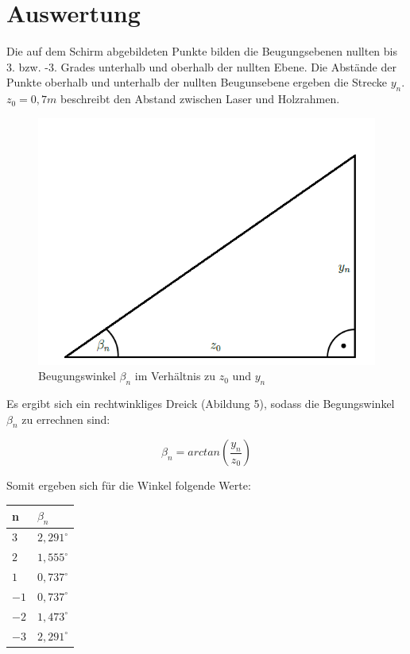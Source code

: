 \documentclass[12pt,a4paper,titlepage,headinclude,bibtotoc]{scrartcl}
\begin{document}
\section{Auswertung}

Die auf dem Schirm abgebildeten Punkte bilden die Beugungsebenen nullten bis 3. bzw. -3. Grades unterhalb und oberhalb der nullten Ebene. Die Abstände der Punkte oberhalb und unterhalb der nullten Beugunsebene ergeben die Strecke $y_n$. $z_0= 0,7 m$ beschreibt den Abstand zwischen Laser und Holzrahmen. 

\begin{figure} [h]
\begin{center}
\includegraphics[scale=0.4]{Dreieck.png} \end{center}
\caption{Beugungswinkel $\beta_n$ im Verhältnis zu $z_0$ und $y_n$}
\end{figure}

Es ergibt sich ein rechtwinkliges Dreick (Abildung 5), sodass die Begungswinkel $\beta_n$ zu errechnen sind:

\begin{equation}
\beta_n = arctan(\frac{y_n}{z_0})
\end{equation}

\par

Somit ergeben sich für die Winkel folgende Werte: 

\begin{table} [h]
\centering
\begin{tabular}{|p{4 cm}||p{4 cm}|}
        \hline
		n& $\beta_n$\\
         \hline 
         $3$ & $2,291^\circ$  \\
         \hline
         $2$ & $1,555^\circ$\\
         \hline
         $1$ & $0,737^\circ$ \\
         \hline
         $-1$ & $0,737^\circ$ \\
         \hline
         $-2$ & $1,473^\circ$ \\
         \hline             
         $-3$ & $2,291^\circ$ \\
         \hline
\end{tabular}
\end{table}
\end{document}
